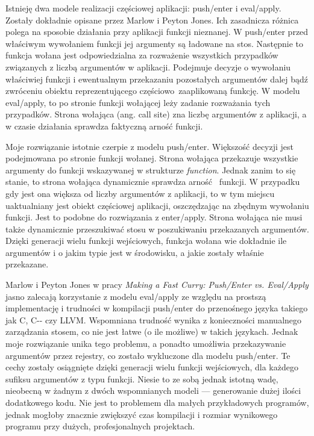 \documentclass[declaration,shortabstract]{iithesis}
\begin{document}
Istnieję dwa modele realizacji częściowej aplikacji: push/enter i eval/apply. 
Zostały dokładnie opisane przez Marlow i Peyton Jones\cite{fast_curry}. 
Ich zasadnicza różnica polega na sposobie działania przy aplikacji funkcji 
nieznanej. W push/enter przed właściwym wywołaniem funkcji jej argumenty są 
ładowane na stos. Następnie to funkcja wołana jest odpowiedzialna za
rozważenie wszystkich przypadków związanych z liczbą argumentów w aplikacji.
Podejmuje decyzje o wywołaniu właściwiej funkcji i ewentualnym przekazaniu 
pozostałych argumentów dalej bądź zwróceniu obiektu reprezentującego częściowo\
zaaplikowaną funkcję. W modelu eval/apply, to po stronie funkcji wołającej 
leży zadanie rozważania tych przypadków. Strona wołająca (ang. call site)
zna liczbę argumentów z aplikacji, a w czasie działania sprawdza 
faktyczną arność funkcji. 

Moje rozwiązanie istotnie czerpie z modelu push/enter. Większość decyzji
jest podejmowana po stronie funkcji wołanej. Strona wołająca przekazuje 
wszystkie argumenty do funkcji wskazywanej w strukturze \textit{function}. 
Jednak zanim to się stanie, to strona wołająca dynamicznie sprawdza arność 
funkcji. W przypadku gdy jest ona większa od liczby argumentów z aplikacji, 
to w tym miejscu uaktualniany jest obiekt częściowej aplikacji, oszczędzając 
na zbędnym wywołaniu funkcji. Jest to podobne do rozwiązania z enter/apply.
Strona wołająca nie musi także dynamicznie przeszukiwać stosu w poszukiwaniu 
przekazanych argumentów. Dzięki generacji wielu funkcji wejściowych, funkcja 
wołana wie dokładnie ile argumentów i o jakim typie jest w środowisku, a jakie 
zostały właśnie przekazane. 

Marlow i Peyton Jones w pracy \textit{Making a Fast Curry: Push/Enter vs.
Eval/Apply} jasno zalecają korzystanie z modelu eval/apply ze względu na 
prostszą implementację i trudności w kompilacji push/enter do przenośnego 
języka takiego jak C, C-{}- czy LLVM. Wspomniana trudność wynika z 
konieczności manualnego zarządzania stosem, co nie jest łatwe (o ile możliwe) 
w takich językach. Jednak moje rozwiązanie unika tego problemu, a ponadto
umożliwia przekazywanie argumentów przez rejestry, co zostało wykluczone dla 
modelu push/enter. Te cechy zostały osiągnięte dzięki generacji wielu funkcji 
wejściowych, dla każdego sufiksu argumentów z typu funkcji. Niesie to ze sobą 
jednak istotną wadę, nieobecną w żadnym z dwóch wspomnianych modeli --- 
generowanie dużej ilości dodatkowego kodu. Nie jest to problemem dla małych 
przykładowych programów, jednak mogłoby znacznie zwiększyć czas kompilacji i 
rozmiar wynikowego programu przy dużych, profesjonalnych projektach.
\end{document}
